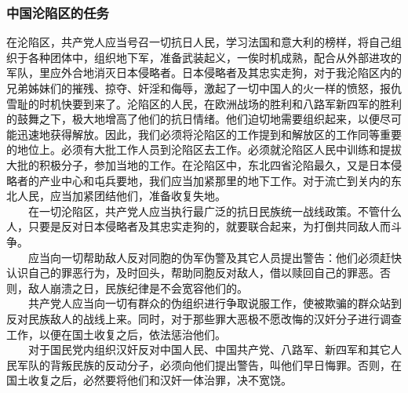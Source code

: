 \documentclass[cn,11pt,chinese]{elegantbook}
\def\myformat#1{\hfil\hfil #1}
\begin{document}
\subsubsection*{\myformat{中国沦陷区的任务}}
在沦陷区，共产党人应当号召一切抗日人民，学习法国和意大利的榜样，将自己组织于各种团体中，组织地下军，准备武装起义，一俟时机成熟，配合从外部进攻的军队，里应外合地消灭日本侵略者。日本侵略者及其忠实走狗，对于我沦陷区内的兄弟姊妹们的摧残、掠夺、奸淫和侮辱，激起了一切中国人的火一样的愤怒，报仇雪耻的时机快要到来了。沦陷区的人民，在欧洲战场的胜利和八路军新四军的胜利的鼓舞之下，极大地增高了他们的抗日情绪。他们迫切地需要组织起来，以便尽可能迅速地获得解放。因此，我们必须将沦陷区的工作提到和解放区的工作同等重要的地位上。必须有大批工作人员到沦陷区去工作。必须就沦陷区人民中训练和提拔大批的积极分子，参加当地的工作。在沦陷区中，东北四省沦陷最久，又是日本侵略者的产业中心和屯兵要地，我们应当加紧那里的地下工作。对于流亡到关内的东北人民，应当加紧团结他们，准备收复失地。\\
　　在一切沦陷区，共产党人应当执行最广泛的抗日民族统一战线政策。不管什么人，只要是反对日本侵略者及其忠实走狗的，就要联合起来，为打倒共同敌人而斗争。\\
　　应当向一切帮助敌人反对同胞的伪军伪警及其它人员提出警告：他们必须赶快认识自己的罪恶行为，及时回头，帮助同胞反对敌人，借以赎回自己的罪恶。否则，敌人崩溃之日，民族纪律是不会宽容他们的。\\
　　共产党人应当向一切有群众的伪组织进行争取说服工作，使被欺骗的群众站到反对民族敌人的战线上来。同时，对于那些罪大恶极不愿改悔的汉奸分子进行调查工作，以便在国土收复之后，依法惩治他们。\\
　　对于国民党内组织汉奸反对中国人民、中国共产党、八路军、新四军和其它人民军队的背叛民族的反动分子，必须向他们提出警告，叫他们早日悔罪。否则，在国土收复之后，必然要将他们和汉奸一体治罪，决不宽饶。\\
\end{document}
